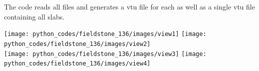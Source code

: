 The code reads all files and generates a vtu file for each as well
as a single vtu file containing all slabs. 

\begin{center}
\texttt{[image: python\_codes/fieldstone\_136/images/view1]}
\texttt{[image: python\_codes/fieldstone\_136/images/view2]}\\
\texttt{[image: python\_codes/fieldstone\_136/images/view3]}
\texttt{[image: python\_codes/fieldstone\_136/images/view4]}
\end{center}
